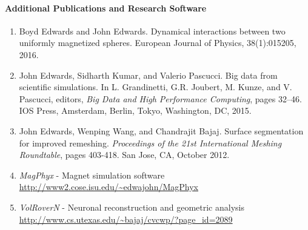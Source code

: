 \documentclass[svgnames,12pt]{article}
\newenvironment{tightenumerate}{
\begin{enumerate}
  \setlength{\itemsep}{1pt}
  \setlength{\parskip}{0pt}
  \setlength{\parsep}{0pt}
}{\end{enumerate}
}
\begin{document}
\paragraph{Additional Publications and Research Software}
\begin{tightenumerate}
\item Boyd Edwards and John Edwards. Dynamical interactions between two uniformly magnetized spheres. European Journal of Physics, 38(1):015205, 2016.
\item John Edwards, Sidharth Kumar, and Valerio Pascucci. Big data from scientific simulations. In L. Grandinetti, G.R. Joubert, M. Kunze, and V. Pascucci, editors, \textit{Big Data and High Performance Computing}, pages 32--46. IOS Press, Amsterdam, Berlin, Tokyo, Washington, DC, 2015.
\item John Edwards, Wenping Wang, and Chandrajit Bajaj. Surface segmentation for improved remeshing. \textit{Proceedings of the 21st International Meshing Roundtable}, pages 403-418. San Jose, CA, October 2012.
\item \emph{MagPhyx} - Magnet simulation software\\
\url{http://www2.cose.isu.edu/~edwajohn/MagPhyx}
\item \emph{VolRoverN} - Neuronal reconstruction and geometric analysis\\
\url{http://www.cs.utexas.edu/~bajaj/cvcwp/?page_id=2089}
\end{tightenumerate}
\end{document}
